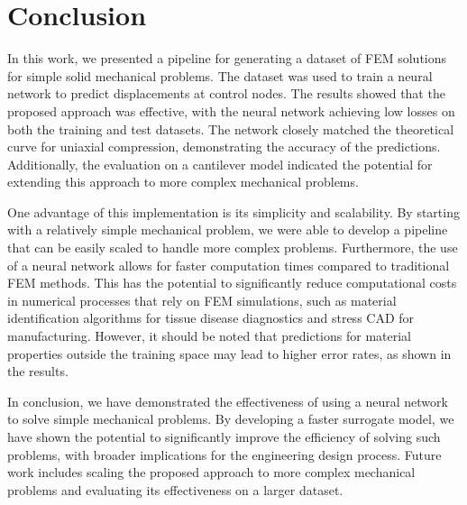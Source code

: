 \documentclass[oneside,a4paper,english,links]{amca}
\begin{document}
\section{Conclusion}
In this work, we presented a pipeline for generating a dataset of FEM solutions for simple solid mechanical problems. The dataset was used to train a neural network to predict displacements at control nodes. The results showed that the proposed approach was effective, with the neural network achieving low losses on both the training and test datasets. The network closely matched the theoretical curve for uniaxial compression, demonstrating the accuracy of the predictions. Additionally, the evaluation on a cantilever model indicated the potential for extending this approach to more complex mechanical problems.

One advantage of this implementation is its simplicity and scalability. By starting with a relatively simple mechanical problem, we were able to develop a pipeline that can be easily scaled to handle more complex problems. Furthermore, the use of a neural network allows for faster computation times compared to traditional FEM methods. This has the potential to significantly reduce computational costs in numerical processes that rely on FEM simulations, such as material identification algorithms for tissue disease diagnostics and stress CAD for manufacturing. However, it should be noted that predictions for material properties outside the training space may lead to higher error rates, as shown in the results.

In conclusion, we have demonstrated the effectiveness of using a neural network to solve simple mechanical problems. By developing a faster surrogate model, we have shown the potential to significantly improve the efficiency of solving such problems, with broader implications for the engineering design process. Future work includes scaling the proposed approach to more complex mechanical problems and evaluating its effectiveness on a larger dataset.


\end{document}

